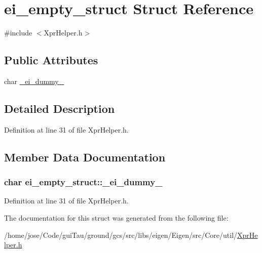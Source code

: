 \hypertarget{structei__empty__struct}{\section{ei\-\_\-empty\-\_\-struct Struct Reference}
\label{structei__empty__struct}
}


{\ttfamily \#include $<$Xpr\-Helper.\-h$>$}

\subsection*{Public Attributes}
\begin{DoxyCompactItemize}
\item 
char \hyperlink{structei__empty__struct_a6fdca4e49535351dc4d30fca50cb6513}{\-\_\-ei\-\_\-dummy\-\_\-}
\end{DoxyCompactItemize}


\subsection{Detailed Description}


Definition at line 31 of file Xpr\-Helper.\-h.



\subsection{Member Data Documentation}
\hypertarget{structei__empty__struct_a6fdca4e49535351dc4d30fca50cb6513}{
\subsubsection[{\-\_\-ei\-\_\-dummy\-\_\-}]{\setlength{\rightskip}{0pt plus 5cm}char ei\-\_\-empty\-\_\-struct\-::\-\_\-ei\-\_\-dummy\-\_\-}}\label{structei__empty__struct_a6fdca4e49535351dc4d30fca50cb6513}


Definition at line 31 of file Xpr\-Helper.\-h.



The documentation for this struct was generated from the following file\-:\begin{DoxyCompactItemize}
\item 
/home/jose/\-Code/gui\-Tau/ground/gcs/src/libs/eigen/\-Eigen/src/\-Core/util/\hyperlink{_xpr_helper_8h}{Xpr\-Helper.\-h}\end{DoxyCompactItemize}
